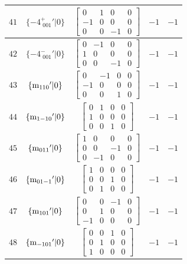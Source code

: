 \documentclass[fleqn,8pt]{jsarticle}
\begin{document}
\begin{longtable}{ccccc}
$ 41 $ & $ \{-4^{+}_{\,\,001}{}'|0\} $ & $ \begin{bmatrix} 0 & 1 & 0 & 0 \\ -1 & 0 & 0 & 0 \\ 0 & 0 & -1 & 0 \end{bmatrix} $ & $ -1 $ & $ -1 $ \\ \hline
$ 42 $ & $ \{-4^{-}_{\,\,001}{}'|0\} $ & $ \begin{bmatrix} 0 & -1 & 0 & 0 \\ 1 & 0 & 0 & 0 \\ 0 & 0 & -1 & 0 \end{bmatrix} $ & $ -1 $ & $ -1 $ \\ \hline
$ 43 $ & $ \{{\rm m}_{110}{}'|0\} $ & $ \begin{bmatrix} 0 & -1 & 0 & 0 \\ -1 & 0 & 0 & 0 \\ 0 & 0 & 1 & 0 \end{bmatrix} $ & $ -1 $ & $ -1 $ \\ \hline
$ 44 $ & $ \{{\rm m}_{1-10}{}'|0\} $ & $ \begin{bmatrix} 0 & 1 & 0 & 0 \\ 1 & 0 & 0 & 0 \\ 0 & 0 & 1 & 0 \end{bmatrix} $ & $ -1 $ & $ -1 $ \\ \hline
$ 45 $ & $ \{{\rm m}_{011}{}'|0\} $ & $ \begin{bmatrix} 1 & 0 & 0 & 0 \\ 0 & 0 & -1 & 0 \\ 0 & -1 & 0 & 0 \end{bmatrix} $ & $ -1 $ & $ -1 $ \\ \hline
$ 46 $ & $ \{{\rm m}_{01-1}{}'|0\} $ & $ \begin{bmatrix} 1 & 0 & 0 & 0 \\ 0 & 0 & 1 & 0 \\ 0 & 1 & 0 & 0 \end{bmatrix} $ & $ -1 $ & $ -1 $ \\ \hline
$ 47 $ & $ \{{\rm m}_{101}{}'|0\} $ & $ \begin{bmatrix} 0 & 0 & -1 & 0 \\ 0 & 1 & 0 & 0 \\ -1 & 0 & 0 & 0 \end{bmatrix} $ & $ -1 $ & $ -1 $ \\ \hline
$ 48 $ & $ \{{\rm m}_{-101}{}'|0\} $ & $ \begin{bmatrix} 0 & 0 & 1 & 0 \\ 0 & 1 & 0 & 0 \\ 1 & 0 & 0 & 0 \end{bmatrix} $ & $ -1 $ & $ -1 $ \\ \hline

\end{longtable}
\end{document}
